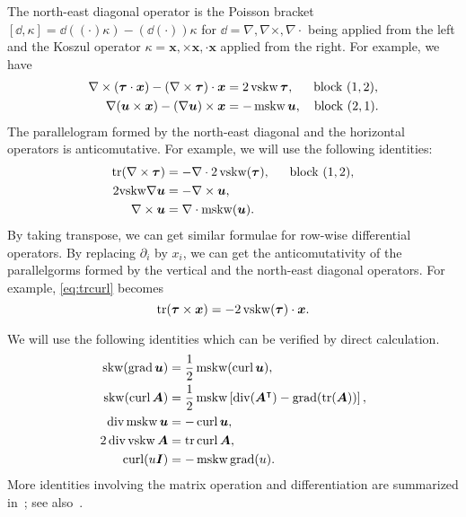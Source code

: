 The north-east diagonal operator is the Poisson bracket $[\dd, \kappa] = \dd((\cdot)\kappa) - (\dd(\cdot))\kappa$ for $\dd = \nabla, \nabla \times, \nabla \cdot$ being applied from the left and the Koszul operator $\kappa = \boldsymbol  x, \times \boldsymbol  x, \cdot \boldsymbol  x$ applied from the right. For example, we have
\begin{align}
\label{eq:curlxtau} \nabla \times (\boldsymbol\tau\cdot \boldsymbol  x) - (\nabla\times \boldsymbol  \tau )\cdot \boldsymbol  x &=  2\vskw\boldsymbol\tau,\quad\;\; \text{block } (1,2),\\
\notag%
\nabla (\boldsymbol  u \times \boldsymbol  x) - (\nabla \boldsymbol  u)\times \boldsymbol  x &= - \mskw \boldsymbol  u, \quad \text{block } (2,1). 
\end{align}
The parallelogram formed by the north-east diagonal and the horizontal operators is anticomutative. For example, we will use the following identities:
\begin{align}
\label{eq:trcurl}
\operatorname*{tr} (\nabla \times \boldsymbol  \tau) &= - \nabla \cdot 2\operatorname{vskw}(\boldsymbol  \tau), \quad\;\; \text{block } (1,2),\\
\notag
2{\rm vskw}\nabla \boldsymbol  u &= - \nabla \times \boldsymbol  u,\\
\notag
\nabla\times \boldsymbol  u &= \nabla\cdot {\rm mskw}(\boldsymbol  u).
\end{align}
By taking transpose, we can get similar formulae for row-wise differential operators. By replacing $\partial_i$ by $x_i$, we can get the anticomutativity of the parallelgorms formed by the vertical and the north-east diagonal operators. For example, \eqref{eq:trcurl} becomes
\begin{equation}\label{eq:trcross}
\operatorname*{tr} (\boldsymbol  \tau \times \boldsymbol x) = - 2\operatorname{vskw}(\boldsymbol  \tau)\cdot \boldsymbol x.
\end{equation}


We will use the following identities  which can be verified by direct calculation. 
\begin{align}
\label{eq:skwgrad}
{\rm skw}(\operatorname{grad}\boldsymbol u) &= \frac{1}{2} \operatorname{mskw} (\operatorname{curl}\boldsymbol u),\\
\label{eq:skwcurl}{\rm skw}(\operatorname{curl}\boldsymbol A) &= \frac{1}{2} \operatorname{mskw}\left[\operatorname{div}(\boldsymbol A^{\intercal})-\operatorname{grad}(\operatorname*{tr}(\boldsymbol A))\right], \\
\label{eq:divmskw} 
\operatorname{div} \operatorname{mskw} \boldsymbol u &= - \operatorname{curl} \boldsymbol u, \\
\label{eq:divvskw} 2\operatorname{div}\operatorname{vskw}\boldsymbol A &= \operatorname*{tr}\operatorname{curl}\boldsymbol A,\\
\label{eq:curlgrad} \operatorname{curl} (u \boldsymbol I)&=- \operatorname{mskw} \operatorname{grad}(u).
\end{align}
More identities involving the matrix operation and differentiation are summarized in~\cite{ArnoldHu2020}; see also~\cite{Chen;Huang:2020Finite,Chen;Huang:2021Finite}.


